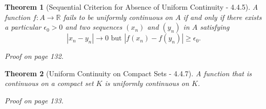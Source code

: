 \documentclass{article}
\newtheorem{theorem}{Theorem}
\begin{document}
\begin{theorem}[Sequential Criterion for Absence of Uniform Continuity - 4.4.5]
    A function $f:A\rightarrow \mathbb{R}$ fails to be uniformly continuous on $A$ if and only if there exists a particular $\epsilon _0 > 0$ and two sequences $(x_n)$ and $(y_n)$ in $A$ satisfying \[|x_n-y_n|\rightarrow 0 \text{ but } |f(x_n)-f(y_n)|\geq \epsilon_0 .\]

    Proof on page 132.
\end{theorem}

\begin{theorem}[Uniform Continuity on Compact Sets - 4.4.7]
    A function that is continuous on a compact set $K$ is uniformly continuous on $K$.

    Proof on page 133.
\end{theorem}
\end{document}

